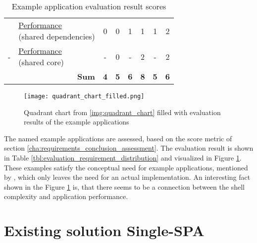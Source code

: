 \begin{table}
\begin{tabular}{|c|l|cc|cc|cc|}
        \multicolumn{1}{|l|}{\nameref{cha:requirement_detail_integration_lifecycle}}   &
        \makecell[l]{\hyperref[cha:requirement_detail_performance]{Performance}                                                                                      \\(shared dependencies)} &
        0                                                                              & 0          & 1          & 1          & 1          & 2                       \\
        \multicolumn{1}{|l|}{- }                                                       &
        \makecell[l]{\hyperref[cha:requirement_detail_performance]{Performance}                                                                                      \\(shared core)} &
        -                                                                              & 0          & -          & 2          & -          & 2                       \\ \hline
        \multicolumn{2}{|r|}{\textbf{Sum}}                                             & \textbf{4} & \textbf{5} & \textbf{6} & \textbf{8} & \textbf{5} & \textbf{6}
    \end{tabular}
    \centering
    \caption{Example application evaluation result scores}
    \label{tbl:eval_app_scores}
\end{table}

\begin{figure}
    \centering
    \texttt{[image: quadrant\_chart\_filled.png]}
    \caption{Quadrant chart from \ref{img:quadrant_chart} filled with evaluation results of the example applications}
    \label{img:quadrant_chart_filled}
\end{figure}


The named example applications are assessed, based on the score metric of section \ref{cha:requirements_conclusion_assessment}.
The evaluation result is shown in Table \ref{tbl:evaluation_requirement_distribution} and visualized in Figure \ref{img:quadrant_chart_filled}.
These examples satisfy the conceptual need for example applications, mentioned by \textciteJovanovic{}, which only leaves the need for an actual implementation.
An interesting fact shown in the Figure \ref{img:quadrant_chart_filled} is, that there seems to be a connection between the shell complexity and application performance.




\section{Existing solution Single-SPA}\label{cha:evaluation_singlespa}

